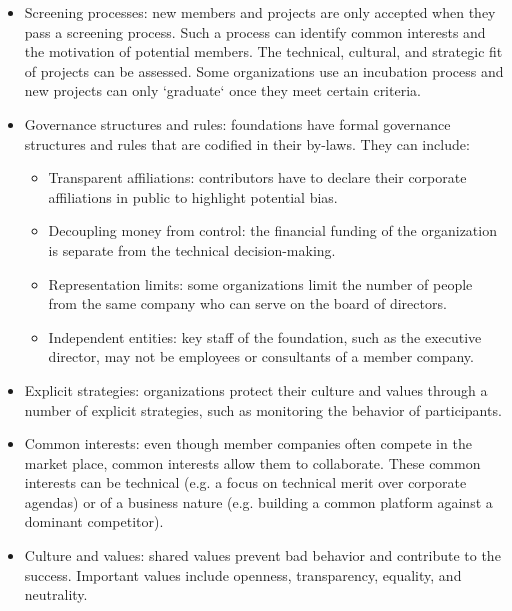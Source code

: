 \begin{itemize}

\itemsep 1em

\item Screening processes: new members and projects are only accepted when they pass a screening process.  Such a process can identify common interests and the motivation of potential members.  The technical, cultural, and strategic fit of projects can be assessed.  Some organizations use an incubation process and new projects can only `graduate` once they meet certain criteria.

\item Governance structures and rules: foundations have formal governance structures and rules that are codified in their by-laws.  They can include:

\begin{itemize}

\itemsep 0.50em

\item Transparent affiliations: contributors have to declare their corporate affiliations in public to highlight potential bias.

\item Decoupling money from control: the financial funding of the organization is separate from the technical decision-making.

\item Representation limits: some organizations limit the number of people from the same company who can serve on the board of directors.

\item Independent entities: key staff of the foundation, such as the executive director, may not be employees or consultants of a member company.

\end{itemize}

\item Explicit strategies: organizations protect their culture and values through a number of explicit strategies, such as monitoring the behavior of participants.

\item Common interests: even though member companies often compete in the market place, common interests allow them to collaborate.  These common interests can be technical (e.g. a focus on technical merit over corporate agendas) or of a business nature (e.g. building a common platform against a dominant competitor).

\item Culture and values: shared values prevent bad behavior and contribute to the success.  Important values include openness, transparency, equality, and neutrality.

\end{itemize}

